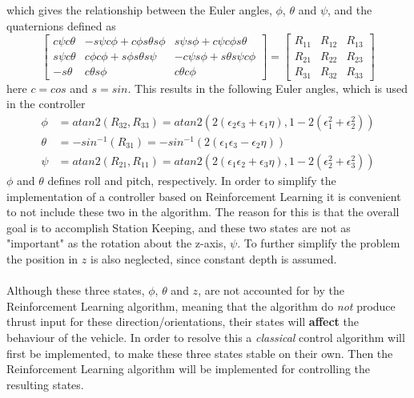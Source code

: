 which gives the relationship between the Euler angles, $\phi$, $\theta$ and $\psi$, and the quaternions defined as 
\begin{equation}
    \begin{bmatrix}
    c\psi c\theta & -s\psi c \phi + c\phi s\theta s\phi & s\psi s\phi + c\psi c\phi s\theta \\ s\psi c\theta & c\phi c\phi + s\phi s\theta s\psi & -c\psi s\phi + s\theta s\psi c\phi \\ -s\theta & c\theta s\phi & c\theta c\phi 
    \end{bmatrix}
    = \begin{bmatrix}
    R_{11} & R_{12} & R_{13} \\ R_{21} & R_{22} & R_{23} \\ R_{31} & R_{32} & R_{33}
    \end{bmatrix}
\end{equation}
here $c = cos$ and $s = sin$. This results in the following Euler angles, which is used in the controller
\begin{align}
    \phi & = atan2(R_{32}, R_{33}) = atan2(2(\epsilon_{2}\epsilon_{3}+\epsilon_{1}\eta), 1 - 2(\epsilon_{1}^{2}+\epsilon_{2}^{2})) \\
    \theta & = -sin^{-1}(R_{31}) = -sin^{-1}(2(\epsilon_{1}\epsilon_{3}-\epsilon_{2}\eta)) \\
    \psi & = atan2(R_{21}, R_{11}) = atan2(2(\epsilon_{1}\epsilon_{2}+\epsilon_{3}\eta), 1 - 2(\epsilon_{2}^{2}+\epsilon_{3}^{2}))
\end{align}
$\phi$ and $\theta$ defines roll and pitch, respectively. In order to simplify the implementation of a controller based on Reinforcement Learning it is convenient to not include these two in the algorithm. The reason for this is that the overall goal is to accomplish Station Keeping, and these two states are not as "important" as the rotation about the z-axis, $\psi$. To further simplify the problem the position in $z$ is also neglected, since constant depth is assumed.\\\\
Although these three states, $\phi$, $\theta$ and $z$, are not accounted for by the Reinforcement Learning algorithm, meaning that the algorithm do \textit{not} produce thrust input for these direction/orientations, their states will \textbf{affect} the behaviour of the vehicle. In order to resolve this a \textit{classical} control algorithm will first be implemented, to make these three states stable on their own. Then the Reinforcement Learning algorithm will be implemented for controlling the resulting states.

